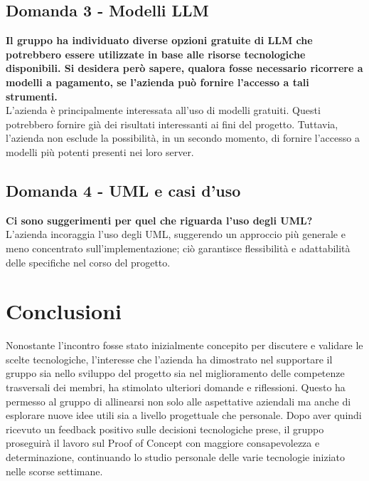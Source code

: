 \documentclass[10pt]{article}
\begin{document}
    \subsection{Domanda 3 - Modelli LLM}
    \textbf{Il gruppo ha individuato diverse opzioni gratuite di LLM che potrebbero essere utilizzate in base alle risorse tecnologiche disponibili. Si desidera però sapere, qualora fosse necessario ricorrere a modelli a pagamento, se l'azienda può fornire l'accesso a tali strumenti.}
    \\
    \textnormal{L’azienda è principalmente interessata all’uso di modelli gratuiti. Questi potrebbero fornire già dei risultati interessanti ai fini del progetto. Tuttavia, l’azienda non esclude la possibilità, in un secondo momento, di fornire l’accesso a modelli più potenti presenti nei loro server.}
    
    \subsection{Domanda 4 - UML e casi d'uso}
    \textbf{Ci sono suggerimenti per quel che riguarda l’uso degli UML?}
    \\
    \textnormal{L’azienda incoraggia l’uso degli UML, suggerendo un approccio più generale e meno concentrato sull’implementazione; ciò garantisce flessibilità e adattabilità delle specifiche nel corso del progetto.}
    \newpage
    
    \section{Conclusioni}
    Nonostante l’incontro fosse stato inizialmente concepito per discutere e validare le scelte tecnologiche, l'interesse che l'azienda ha dimostrato nel supportare il gruppo sia nello sviluppo del progetto sia nel miglioramento delle competenze trasversali dei membri, ha stimolato ulteriori domande e riflessioni. Questo ha permesso al gruppo di allinearsi non solo alle aspettative aziendali ma anche di esplorare nuove idee utili sia a livello progettuale che personale.
    Dopo aver quindi ricevuto un feedback positivo sulle decisioni tecnologiche prese, il gruppo proseguirà il lavoro sul Proof of Concept con maggiore consapevolezza e determinazione, continuando lo studio personale delle varie tecnologie iniziato nelle scorse settimane.
    \newpage
    \newpage
\end{document}
